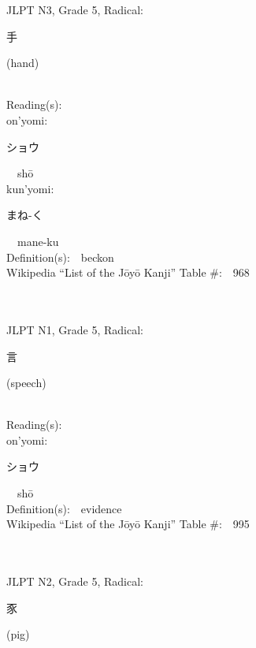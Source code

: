 \begin{multicols}{2}
{JLPT N3, Grade 5, Radical:\ \ {\begin{CJK}{UTF8}{min} 手 \end{CJK}} (hand) } \\
Reading(s):\ \ \\
{\hspace*{1em}}on'yomi:\ \ \\
{\hspace*{2em}}{\begin{CJK}{UTF8}{min} ショウ \end{CJK}}\ \ sh\=o\ \ \\
{\hspace*{1em}}kun'yomi:\ \ \\
{\hspace*{2em}}{\begin{CJK}{UTF8}{min} まね-く \end{CJK}}\ \ mane-ku\ \ \\
Definition(s):\ \ beckon \\
Wikipedia ``List of the J\=oy\=o Kanji'' Table \#:\ \ 968 \\
\ \ \\
{\fontsize{34pt}{40pt}  }\ \ \\  %
{JLPT N1, Grade 5, Radical:\ \ {\begin{CJK}{UTF8}{min} 言 \end{CJK}} (speech) } \\
Reading(s):\ \ \\
{\hspace*{1em}}on'yomi:\ \ \\
{\hspace*{2em}}{\begin{CJK}{UTF8}{min} ショウ \end{CJK}}\ \ sh\=o\ \ \\
Definition(s):\ \ evidence \\
Wikipedia ``List of the J\=oy\=o Kanji'' Table \#:\ \ 995 \\
\ \ \\
{\fontsize{34pt}{40pt}  }\ \ \\  %
{JLPT N2, Grade 5, Radical:\ \ {\begin{CJK}{UTF8}{min} 豕 \end{CJK}} (pig) } \\

\end{multicols}
